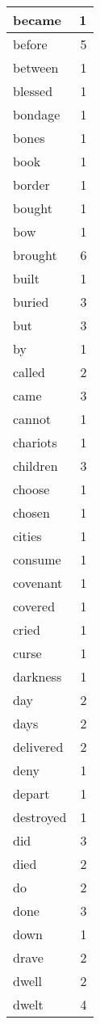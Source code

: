 \begin{center}
\begin{longtable}{l|r}
became & 1\\ \hline 
before & 5\\ \hline 
between & 1\\ \hline 
blessed & 1\\ \hline 
bondage & 1\\ \hline 
bones & 1\\ \hline 
book & 1\\ \hline 
border & 1\\ \hline 
bought & 1\\ \hline 
bow & 1\\ \hline 
brought & 6\\ \hline 
built & 1\\ \hline 
buried & 3\\ \hline 
but & 3\\ \hline 
by & 1\\ \hline 
called & 2\\ \hline 
came & 3\\ \hline 
cannot & 1\\ \hline 
chariots & 1\\ \hline 
children & 3\\ \hline 
choose & 1\\ \hline 
chosen & 1\\ \hline 
cities & 1\\ \hline 
consume & 1\\ \hline 
covenant & 1\\ \hline 
covered & 1\\ \hline 
cried & 1\\ \hline 
curse & 1\\ \hline 
darkness & 1\\ \hline 
day & 2\\ \hline 
days & 2\\ \hline 
delivered & 2\\ \hline 
deny & 1\\ \hline 
depart & 1\\ \hline 
destroyed & 1\\ \hline 
did & 3\\ \hline 
died & 2\\ \hline 
do & 2\\ \hline 
done & 3\\ \hline 
down & 1\\ \hline 
drave & 2\\ \hline 
dwell & 2\\ \hline 
dwelt & 4\\ \hline 

\end{longtable}
\end{center}
